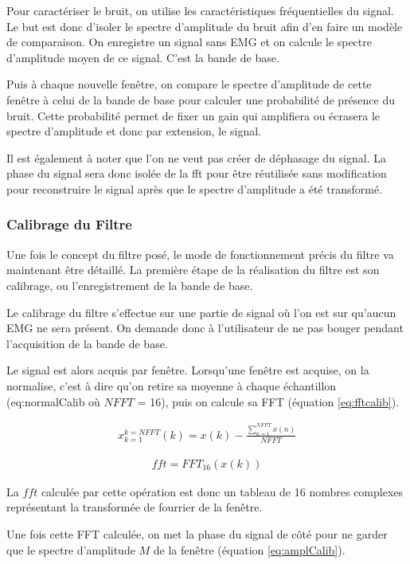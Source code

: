 \documentclass[letterpaper, twoside, 12pt, memoire, creativecommons, hyperref]{thETS}
\begin{document}
Pour caractériser le bruit, on utilise les caractéristiques fréquentielles du signal. Le but est donc d'isoler le spectre d'amplitude du bruit afin d'en faire un modèle de comparaison. On enregistre un signal sans EMG et on calcule le spectre d'amplitude moyen de ce signal. C'est la bande de base.

Puis à chaque nouvelle fenêtre, on compare le spectre d'amplitude de cette fenêtre à celui de la bande de base pour calculer une probabilité de présence du bruit. Cette probabilité permet de fixer un gain qui amplifiera ou écrasera le spectre d'amplitude et donc par extension, le signal.

Il est également à noter que l'on ne veut pas créer de déphasage du signal. La phase du signal sera donc isolée de la fft pour être réutilisée sans modification pour reconstruire le signal après que le spectre d'amplitude a été transformé.  

\subsubsection{Calibrage du Filtre}

Une fois le concept du filtre posé, le mode de fonctionnement précis du filtre va maintenant être détaillé. La première étape de la réalisation du filtre est son calibrage, ou l'enregistrement de la bande de base. 

Le calibrage du filtre s'effectue sur une partie de signal où l'on est sur qu'aucun EMG ne sera présent. On demande donc à l'utilisateur de ne pas bouger pendant l'acquisition de la bande de base. 

Le signal est alors acquis par fenêtre. Lorsqu'une fenêtre est acquise, on la normalise, c'est à dire qu'on retire sa moyenne à chaque échantillon (eq:normalCalib où $NFFT$ = 16), puis on calcule sa FFT (équation \ref{eq:fftcalib}).

\begin{align}\label{eq:normalCalib}
   x_{k=1}^{k=NFFT}(k) = x(k) - \frac{\sum_{n=1}^{NFFT}x(n)}{NFFT}
\end{align}

\begin{align}\label{eq:fftcalib}
   fft = FFT_{16}(x(k)) 
\end{align}

La $fft$ calculée par cette opération est donc un tableau de 16 nombres complexes représentant la transformée de fourrier de la fenêtre.

Une fois cette FFT calculée, on met la phase du signal de côté pour ne garder que le spectre d'amplitude $M$ de la fenêtre (équation \ref{eq:amplCalib}).
\end{document}
